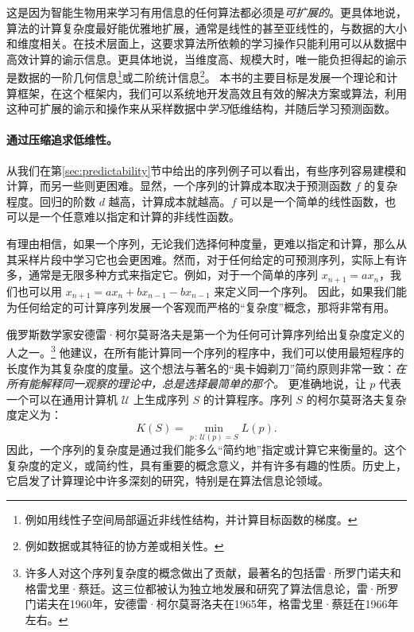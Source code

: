 \documentclass[../../book-main_zh.tex]{subfiles}
\begin{document}
这是因为智能生物用来学习有用信息的任何算法都必须是{\em 可扩展的}。更具体地说，算法的计算复杂度最好能优雅地扩展，通常是线性的甚至亚线性的，与数据的大小和维度相关。在技术层面上，这要求算法所依赖的学习操作只能利用可以从数据中高效计算的谕示信息。更具体地说，当维度高、规模大时，唯一能负担得起的谕示是数据的一阶几何信息\footnote{例如用线性子空间局部逼近非线性结构，并计算目标函数的梯度。}或二阶统计信息\footnote{例如数据或其特征的协方差或相关性。}。
本书的主要目标是发展一个理论和计算框架，在这个框架内，我们可以系统地开发高效且有效的解决方案或算法，利用这种可扩展的谕示和操作来从采样数据中{\em 学习}低维结构，并随后学习预测函数。


\paragraph{通过压缩追求低维性。}
从我们在第\ref{sec:predictability}节中给出的序列例子可以看出，有些序列容易建模和计算，而另一些则更困难。显然，一个序列的计算成本取决于预测函数 $f$ 的复杂程度。回归的阶数 $d$ 越高，计算成本就越高。$f$ 可以是一个简单的线性函数，也可以是一个任意难以指定和计算的非线性函数。

有理由相信，如果一个序列，无论我们选择何种度量，更难以指定和计算，那么从其采样片段中学习它也会更困难。然而，对于任何给定的可预测序列，实际上有许多，通常是无限多种方式来指定它。例如，对于一个简单的序列 $x_{n+1} = a x_{n}$，我们也可以用 $x_{n+1} = a x_n + b x_{n-1} - b x_{n-1}$ 来定义同一个序列。
因此，如果我们能为任何给定的可计算序列发展一个客观而严格的“复杂度”概念，那将非常有用。

俄罗斯数学家安德雷·柯尔莫哥洛夫是第一个为任何可计算序列给出复杂度定义的人之一。\footnote{许多人对这个序列复杂度的概念做出了贡献，最著名的包括雷·所罗门诺夫和格雷戈里·蔡廷。这三位都被认为独立地发展和研究了算法信息论，雷·所罗门诺夫在1960年，安德雷·柯尔莫哥洛夫在1965年\cite{Kolmogorov1998OnTO}，格雷戈里·蔡廷在1966年左右\cite{Chaitin-1966}。} 他建议，在所有能计算同一个序列的程序中，我们可以使用最短程序的长度作为其复杂度的度量。这个想法与著名的“奥卡姆剃刀”简约原则非常一致：{\em 在所有能解释同一观察的理论中，总是选择最简单的那个。} 更准确地说，让 $p$ 代表一个可以在通用计算机 $\mathcal{U}$ 上生成序列 $S$ 的计算程序。序列 $S$ 的柯尔莫哥洛夫复杂度定义为：
\begin{equation}
    K(S) = \min_{p\,:\, \mathcal{U}(p) = S} L(p). 
\end{equation}
因此，一个序列的复杂度是通过我们能多么“简约地”指定或计算它来衡量的。这个复杂度的定义，或简约性，具有重要的概念意义，并有许多有趣的性质。历史上，它启发了计算理论中许多深刻的研究，特别是在算法信息论领域。
\end{document}
